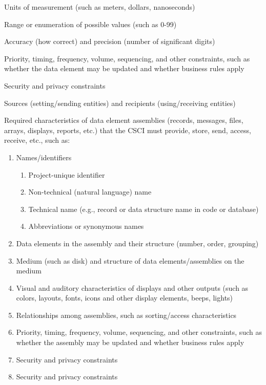 Units of measurement (such as meters, dollars, nanoseconds)

Range or enumeration of possible values (such as 0-99)

Accuracy (how correct) and precision (number of significant digits)

Priority, timing, frequency, volume, sequencing, and other constraints,
such as whether the data element may be updated and whether business
rules apply

Security and privacy constraints

Sources (setting/sending entities) and recipients (using/receiving
entities)

Required characteristics of data element assemblies (records, messages,
files, arrays, displays, reports, etc.) that the CSCI must provide,
store, send, access, receive, etc., such as:

\begin{enumerate}
\itemsep1pt\parskip0pt
\item
  Names/identifiers

  \begin{enumerate}
  \itemsep1pt\parskip0pt
  \item
    Project-unique identifier
  \item
    Non-technical (natural language) name
  \item
    Technical name (e.g., record or data structure name in code or
    database)
  \item
    Abbreviations or synonymous names
  \end{enumerate}
\item
  Data elements in the assembly and their structure (number, order,
  grouping)
\item
  Medium (such as disk) and structure of data elements/assemblies on the
  medium
\item
  Visual and auditory characteristics of displays and other outputs
  (such as colors, layouts, fonts, icons and other display elements,
  beeps, lights)
\item
  Relationships among assemblies, such as sorting/access characteristics
\item
  Priority, timing, frequency, volume, sequencing, and other
  constraints, such as whether the assembly may be updated and whether
  business rules apply
\item
  Security and privacy constraints
\item
  Security and privacy constraints
\end{enumerate}

